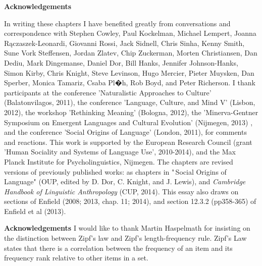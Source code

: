 \newpage


\textbf{Acknowledgements}



In writing these chapters I have benefited greatly from conversations 
and correspondence with Stephen Cowley, Paul Kockelman, Michael Lempert, 
Joanna R\k{a}czaszek-Leonardi, Giovanni Rossi, Jack Sidnell, Chris Sinha, 
Kenny Smith, Sune Vork Steffensen, Jordan Zlatev, Chip Zuckerman, Morten 
Christiansen, Dan Dediu, Mark Dingemanse, Daniel Dor, Bill Hanks, 
Jennifer Johnson-Hanks, Simon Kirby, Chris Knight, Steve Levinson, Hugo 
Mercier, Pieter Muysken, Dan Sperber, Monica Tamariz, Csaba Pl�h, Rob 
Boyd, and Peter Richerson. I thank participants at the conference 
'Naturalistic Approaches to Culture' (Balatonvilagos, 2011), the 
conference 'Language, Culture, and Mind V' (Lisbon, 2012), the workshop 
'Rethinking Meaning' (Bologna, 2012), the 'Minerva-Gentner Symposium on 
Emergent Languages and Cultural Evolution' (Nijmegen, 2013) , and the 
conference 'Social Origins of Language' (London, 2011), for comments and 
reactions. This work is supported by the European Research Council 
(grant 'Human Sociality and Systems of Language Use', 2010-2014), and 
the Max Planck Institute for Psycholinguistics, Nijmegen. The chapters 
are revised versions of previously published works: as chapters in 
"\,Social Origins of Language" (OUP, edited by D. Dor, C. Knight, and J. 
Lewis), and \textit{Cambridge Handbook of Linguistic Anthropology} 
(CUP, 2014). This essay also draws on sections of Enfield (2008; 2013, 
chap. 11; 2014), and section 12.3.2 (pp358-365) of Enfield et al (2013). 



\textbf{Acknowledgements}
I would like to thank Martin Haspelmath for insisting on the distinction between Zipf's law and Zipf's length-frequency rule. Zipf's Law states that there is a correlation between the frequency of an item and its frequency rank relative to other items in a set.


